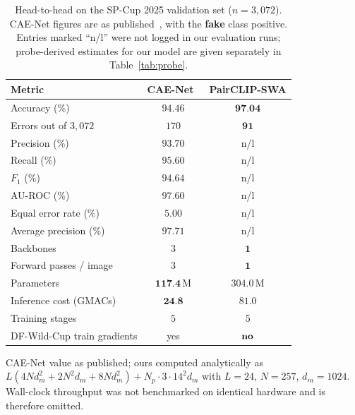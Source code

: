 \documentclass[10pt,journal]{IEEEtran}
\newcommand{\best}[1]{\textbf{#1}}
\begin{document}
\begin{table}[!t]
\caption{Head-to-head on the SP-Cup 2025 validation set ($n=3{,}072$). CAE-Net
figures are as published~\cite{bhattacharjee2026caenet}, with the \textbf{fake}
class positive. Entries marked ``n/l'' were not logged in our evaluation runs;
probe-derived estimates for our model are given separately in
Table~\ref{tab:probe}.}
\label{tab:head2head}
\centering
\footnotesize
\begin{threeparttable}
\begin{tabular}{@{}lcc@{}}
\toprule
Metric & CAE-Net~\cite{bhattacharjee2026caenet} & PairCLIP-SWA \\
\midrule
Accuracy (\%)              & $94.46$ & $\best{97.04}$ \\
Errors out of $3{,}072$     & $170$   & $\best{91}$ \\
Precision (\%)             & $93.70$ & n/l \\
Recall (\%)                & $95.60$ & n/l \\
$F_1$ (\%)                 & $94.64$ & n/l \\
AU-ROC (\%)                & $97.60$ & n/l \\
Equal error rate (\%)      & $5.00$  & n/l \\
Average precision (\%)     & $97.71$ & n/l \\
\midrule
Backbones                  & $3$ & $\best{1}$ \\
Forward passes / image     & $3$ & $\best{1}$ \\
Parameters                 & $\best{117.4}$\,M & $304.0$\,M \\
Inference cost (GMACs)\tnote{a} & $\best{24.8}$ & $81.0$ \\
Training stages            & $5$ & $5$ \\
DF-Wild-Cup train gradients & yes & $\best{\text{no}}$ \\
\bottomrule
\end{tabular}
\begin{tablenotes}[flushleft]\footnotesize
\item[a] CAE-Net value as published; ours computed analytically as
$L(4Nd_m^2+2N^2d_m+8Nd_m^2)+N_p\!\cdot\!3\!\cdot\!14^2 d_m$ with $L=24$,
$N=257$, $d_m=1024$. Wall-clock throughput was not benchmarked on identical
hardware and is therefore omitted.
\end{tablenotes}
\end{threeparttable}
\end{table}
\end{document}

